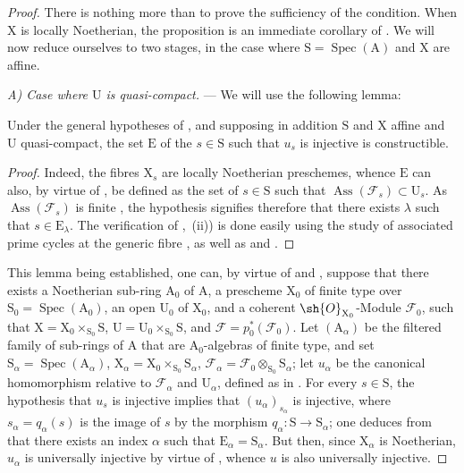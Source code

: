 \begin{proof}
There is nothing more than to prove the sufficiency of the condition.
When $\mathrm{X}$ is locally Noetherian, the proposition is an immediate corollary of .
We will now reduce ourselves to two stages, in the case where $\mathrm{S}=\operatorname{Spec}(\mathrm{A})$ and $\mathrm{X}$ are affine.
\medskip

\emph{A) Case where $\mathrm{U}$ is quasi-compact.} --- We will use the following lemma:

\begin{lemma}[11.9.17.1]
\label{IV.11.9.17.1}
Under the general hypotheses of , and supposing in addition $\mathrm{S}$ and $\mathrm{X}$ affine and $\mathrm{U}$ quasi-compact, the set $\mathrm{E}$ of the $s\in\mathrm{S}$ such that $u_s$ is injective is constructible.
\end{lemma}

\begin{proof}
Indeed, the fibres $\mathrm{X}_s$ are locally Noetherian preschemes, whence $\mathrm{E}$ can also, by virtue of , be defined as the set of $s\in\mathrm{S}$ such that $\operatorname{Ass}(\mathscr{F}_s)\subset\mathrm{U}_s$.
As $\operatorname{Ass}(\mathscr{F}_s)$ is finite , the hypothesis signifies therefore that
there exists $\lambda$ such that $s\in\mathrm{E}_\lambda$.
The verification of ,~(ii)) is done easily using the study of associated prime cycles at the generic fibre , as well as  and .
\end{proof}

This lemma being established, one can, by virtue of  and , suppose that there exists a Noetherian sub-ring $\mathrm{A}_0$ of $\mathrm{A}$, a prescheme $\mathrm{X}_0$ of finite type over $\mathrm{S}_0=\operatorname{Spec}(\mathrm{A}_0)$, an open $\mathrm{U}_0$ of $\mathrm{X}_0$, and a coherent $\sh{O}_{\mathrm{X}_0}$-Module $\mathscr{F}_0$, such that $\mathrm{X}=\mathrm{X}_0\times_{\mathrm{S}_0}\mathrm{S}$, $\mathrm{U}=\mathrm{U}_0\times_{\mathrm{S}_0}\mathrm{S}$, and $\mathscr{F}=p_0^*(\mathscr{F}_0)$.
Let $(\mathrm{A}_\alpha)$ be the filtered family of sub-rings of $\mathrm{A}$ that are $\mathrm{A}_0$-algebras of finite type, and set $\mathrm{S}_\alpha=\operatorname{Spec}(\mathrm{A}_\alpha)$, $\mathrm{X}_\alpha=\mathrm{X}_0\times_{\mathrm{S}_0}\mathrm{S}_\alpha$, $\mathscr{F}_\alpha=\mathscr{F}_0\otimes_{\mathrm{S}_0}\mathrm{S}_\alpha$; let $u_\alpha$ be the canonical homomorphism relative to $\mathscr{F}_\alpha$ and $\mathrm{U}_\alpha$, defined as in .
For every $s\in\mathrm{S}$, the hypothesis that $u_s$ is injective implies that $(u_\alpha)_{s_\alpha}$ is injective, where $s_\alpha=q_\alpha(s)$ is the image of $s$ by the morphism $q_\alpha:\mathrm{S}\to\mathrm{S}_\alpha$; one deduces from  that there exists an index $\alpha$ such that $\mathrm{E}_\alpha=\mathrm{S}_\alpha$.
But then, since $\mathrm{X}_\alpha$ is Noetherian, $u_\alpha$ is universally injective by virtue of , whence $u$ is also universally injective.
\medskip


\end{proof}
